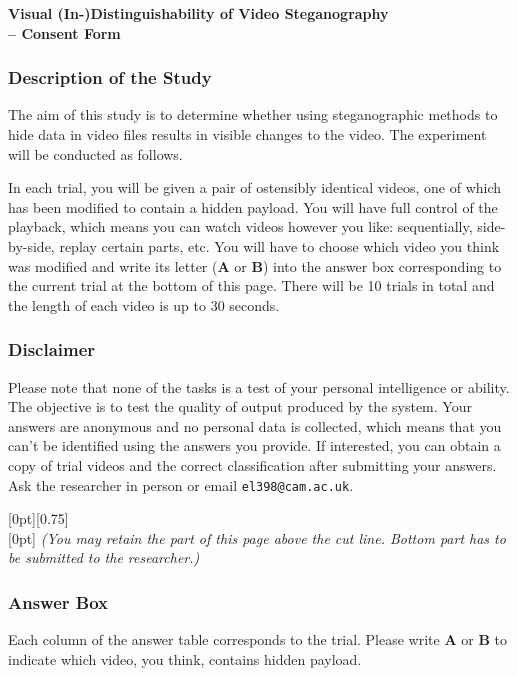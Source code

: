 \documentclass[12pt,british,usenames,dvipsnames,hypens,final]{scrartcl}
\numberwithin{equation}{section}
\numberwithin{figure}{section}
\newcommand{\textsb}[1]{\textsf{\textbf{#1}}}
\newcommand{\cuthere}{%
\noindent
\raisebox{-2.8pt}[0pt][0.75\baselineskip]{\small\ding{34}}
\unskip{\tiny\dotfill}
}
\begin{document}
{%
\Large \sffamily \textbf{Visual (In-)Distinguishability of Video Steganography \\ -- Consent Form}\smallskip
}

\subsubsection*{Description of the Study}

The aim of this study is to determine whether using steganographic methods to hide data in video files results in visible changes to the video. The experiment will be conducted as follows.

In each trial, you will be given a pair of ostensibly identical videos, one of which has been modified to contain a hidden payload. You will have full control of the playback, which means you can watch videos however you like: sequentially, side-by-side, replay certain parts, etc. You will have to choose which video you think was modified and write its letter (\textsb{A} or \textsb{B}) into the answer box corresponding to the current trial at the bottom of this page. There will be 10 trials in total and the length of each video is up to 30 seconds. 

\subsubsection*{Disclaimer}

Please note that none of the tasks is a test of your personal intelligence or ability. The objective is to test the quality of output produced by the system. Your answers are anonymous and no personal data is collected, which means that you can't be identified using the answers you provide. If interested, you can obtain a copy of trial videos and the correct classification after submitting your answers. Ask the researcher in person or email \texttt{el398@cam.ac.uk}.

{%
\vspace{-0.1cm}
\smallskip
\cuthere\\
\medskip
\raisebox{4.5pt}[0pt]{\small \:\: \textit{(You may retain the part of this page above the cut line. Bottom part has to be submitted to the researcher.)}}
\vspace{-0.4cm}
}


\subsubsection*{Answer Box}
Each column of the answer table corresponds to the trial. Please write \textsb{A} or \textsb{B} to indicate which video, you think, contains hidden payload.
\end{document}
